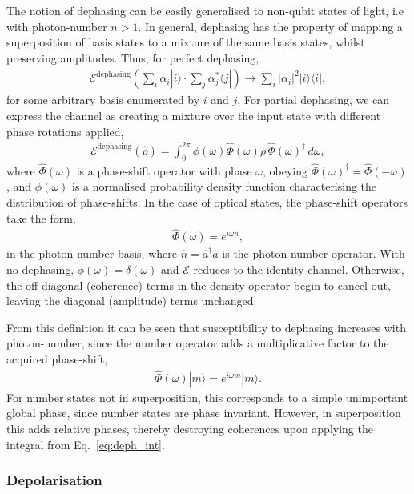 \documentclass[aps,rmp,twocolumn,amsmath,amssymb,nofootinbib,superscriptaddress]{revtex4}
\newcommand{\bra}[1]{\langle#1|}
\newcommand{\ket}[1]{|#1\rangle}
\begin{document}
The notion of dephasing can be easily generalised to non-qubit states of light, i.e with photon-number \mbox{$n>1$}. In general, dephasing has the property of mapping a superposition of basis states to a mixture of the same basis states, whilst preserving amplitudes. Thus, for perfect dephasing,
\begin{align}
\mathcal{E}^\mathrm{dephasing}\left(\sum_i \alpha_i\ket{i} \cdot \sum_j \alpha_j^*\bra{j} \right) \to \sum_i |\alpha_i|^2 \ket{i}\bra{i},
\end{align}
for some arbitrary basis enumerated by $i$ and $j$. For partial dephasing, we can express the channel as creating a mixture over the input state with different phase rotations applied,
\begin{align} \label{eq:deph_int}
\mathcal{E}^\mathrm{dephasing}(\hat\rho) = \int_{0}^{2\pi} \phi(\omega) \hat{\Phi}(\omega)\hat\rho\,\hat{\Phi}(\omega)^\dag\,d\omega,
\end{align}
where $\hat{\Phi}(\omega)$ is a phase-shift operator with phase $\omega$, obeying \mbox{$\hat\Phi(\omega)^\dag = \hat\Phi(-\omega)$}, and $\phi(\omega)$ is a normalised probability density function characterising the distribution of phase-shifts. In the case of optical states, the phase-shift operators take the form,
\begin{align}
\hat\Phi(\omega) = e^{i\omega\hat{n}},
\end{align}
in the photon-number basis, where $\hat{n}=\hat{a}^\dag\hat{a}$ is the photon-number operator. With no dephasing, \mbox{$\phi(\omega)=\delta(\omega)$} and $\mathcal{E}$ reduces to the identity channel. Otherwise, the off-diagonal (coherence) terms in the density operator begin to cancel out, leaving the diagonal (amplitude) terms unchanged.

From this definition it can be seen that susceptibility to dephasing increases with photon-number, since the number operator adds a multiplicative factor to the acquired phase-shift,
\begin{align}
\hat\Phi(\omega) \ket{m} = e^{i\omega m}\ket{m}.
\end{align}
For number states not in superposition, this corresponds to a simple unimportant global phase, since number states are phase invariant. However, in superposition this adds relative phases, thereby destroying coherences upon applying the integral from Eq.~\ref{eq:deph_int}.

%
%

\subsubsection{Depolarisation}
\end{document}
